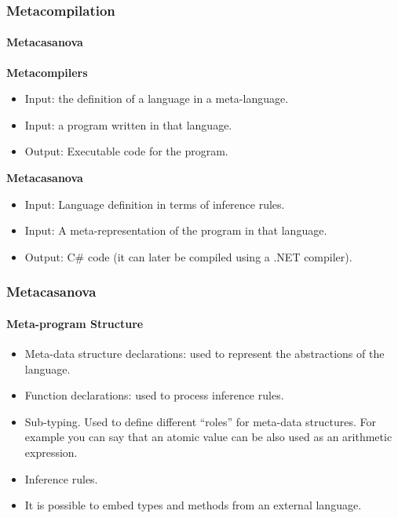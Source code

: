 \documentclass[10pt,a4paper]{beamer}
\begin{document}
\begin{frame}
\frametitle{Metacompilation}
\framesubtitle{Metacasanova}

\textbf{Metacompilers}
\begin{itemize}
	\item Input: the definition of a language in a meta-language.
	\item Input: a program written in that language.
	\item Output: Executable code for the program.
\end{itemize}

\textbf{Metacasanova}
\begin{itemize}
	\item Input: Language definition in terms of inference rules.
	\item Input: A meta-representation of the program in that language.
	\item Output: C\# code (it can later be compiled using a .NET compiler).
\end{itemize}
\end{frame}

\begin{frame}
\frametitle{Metacasanova}
\framesubtitle{Meta-program Structure}

\begin{itemize}
	\item Meta-data structure declarations: used to represent the abstractions of the language.
	\item Function declarations: used to process inference rules.
	\item Sub-typing. Used to define different ``roles'' for meta-data structures. For example you can say that an atomic value can be also used as an arithmetic expression.
	\item Inference rules.
	\item It is possible to embed types and methods from an external language.
\end{itemize}
\end{frame}
\end{document}
